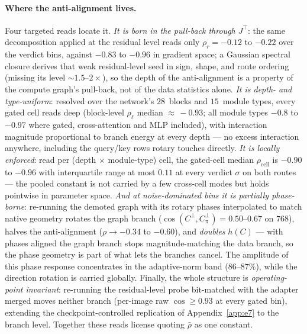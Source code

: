 \paragraph{Where the anti-alignment lives.}
Four targeted reads locate it. \emph{It is born in the pull-back
through $J^{\!\top}$}: the same decomposition applied at the residual
level reads only $\rho_r = -0.12$ to $-0.22$ over the verdict bins,
against $-0.83$ to $-0.96$ in gradient space; a Gaussian spectral
closure derives that weak residual-level seed in sign, shape, and
route ordering (missing its level ${\sim}1.5$--$2\times$), so the
depth of the anti-alignment is a property of the compute graph's
pull-back, not of the data statistics alone. \emph{It is
depth- and type-uniform}: resolved over the network's
$28$~blocks and $15$~module types, every gated cell reads deep
(block-level $\rho_\ell$ median ${\approx}\,{-}0.93$; all module
types $-0.8$ to $-0.97$ where gated, cross-attention and MLP
included), with interaction magnitude proportional to branch energy
at every depth --- no excess interaction anywhere, including the
query/key rows rotary touches directly. \emph{It is locally
enforced}: read per (depth $\times$ module-type) cell, the gated-cell
median $\rho_{\mathrm{cell}}$ is $-0.90$ to $-0.96$ with
interquartile range at most $0.11$ at every verdict $\sigma$ on both
routes --- the pooled constant is not carried by a few cross-cell
modes but holds pointwise in parameter space. \emph{And at
noise-dominated bins it is partially phase-borne}: re-running the
demoted graph with its rotary phases interpolated to match native
geometry rotates the graph branch
($\cos(C^{\perp}, C_{\pi}^{\perp}) = 0.50$--$0.67$ on $768$),
halves the anti-alignment ($\rho \to -0.34$ to $-0.60$), and
\emph{doubles} $h(C)$ --- with phases aligned the graph branch stops
magnitude-matching the data branch, so the phase geometry is part of
what lets the branches cancel. The amplitude of this phase response
concentrates in the adaptive-norm band ($86$--$87\%$), while the
direction rotation is carried globally. Finally, the whole structure
is \emph{operating-point invariant}: re-running the residual-level
probe bit-matched with the adapter merged moves neither branch
(per-image raw $\cos \ge 0.93$ at every gated bin), extending the
checkpoint-controlled replication of Appendix~\ref{app:e7} to the
branch level. Together these reads license quoting $\bar\rho$ as one
constant.

